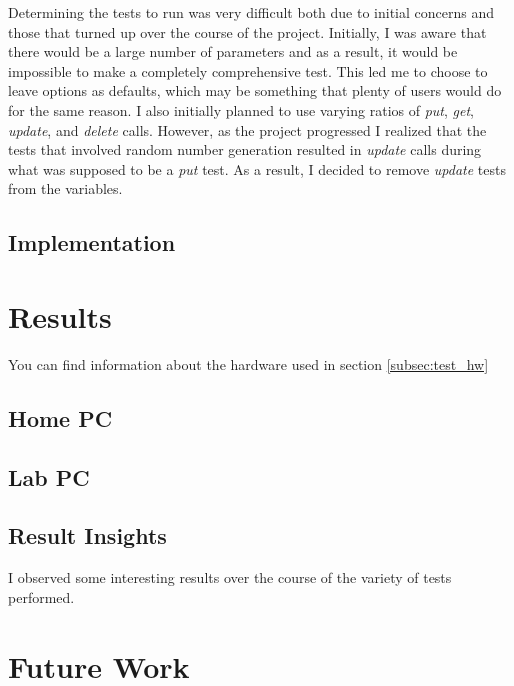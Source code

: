 \documentclass[twocolumn,11pt]{article}
\begin{document}
Determining the tests to run was very difficult both due to initial concerns and
those that turned up over the course of the project. Initially, I was aware that
there would be a large number of parameters and as a result, it would be
impossible to make a completely comprehensive test. This led me to choose to
leave options as defaults, which may be something that plenty of users would do
for the same reason. I also initially planned to use varying ratios of
\textit{put}, \textit{get}, \textit{update}, and \textit{delete} calls. However,
as the project progressed I realized that the tests that involved random number
generation resulted in \textit{update} calls during what was supposed to be a
\textit{put} test. As a result, I decided to remove \textit{update} tests from
the variables.

\subsection{Implementation}


\section{Results}

You can find information about the hardware used in section \ref{subsec:test_hw}

\subsection{Home PC}


\subsection{Lab PC}


\subsection{Result Insights}


I observed some interesting results over the course of the variety of tests
performed.

\section{Future Work}
\label{sec:future_work}
\end{document}
